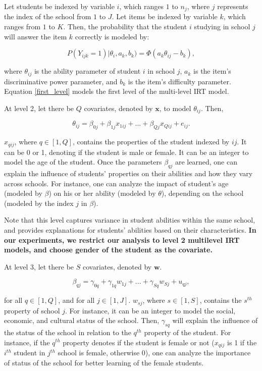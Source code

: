 \documentclass[12pt]{article}
\begin{document}
Let students be indexed by variable $i$, which ranges $1$ to $n_j$, where $j$ represents the index of the school from $1$ to $J$. Let items be indexed by variable $k$, which ranges from $1$ to $K$. Then, the probability that the student $i$ studying in school $j$ will answer the item $k$ correctly is modeled by:

\begin{equation}\label{first_level}
    P(Y_{ijk}=1) | \theta_i, a_k, b_k) = \Phi(a_k \theta_{ij} - b_k),
\end{equation}

where $\theta_{ij}$ is the ability parameter of student $i$ in school $j$, $a_k$ is the item's discriminative power parameter, and $b_k$ is the item's difficulty parameter. Equation \eqref{first_level} models the first level of the multi-level IRT model.

At level 2, let there be $Q$ covariates, denoted by $\boldsymbol{x}$, to model $\theta_{ij}$. Then,

\begin{equation}\label{second_level}
    \theta_{ij} = \beta_{0j} + \beta_{1j}x_{1ij} + ... + \beta_{Qj}x_{Qij} + e_{ij}.
\end{equation}

$x_{qij}$, where $q \in [1, Q]$, contains the properties of the student indexed by $ij$. It can be 0 or 1, denoting if the student is male or female. It can be an integer to model the age of the student. Once the parameters $\beta_{qj}$ are learned, one can explain the influence of students' properties on their abilities and how they vary across schools. For instance, one can analyze the impact of student's age (modeled by $\beta$) on his or her ability (modeled by $\theta$), depending on the school (modeled by the index $j$ in $\beta$).

Note that this level captures variance in student abilities within the same school, and provides explanations for students' abilities based on their characteristics. \textbf{In our experiments, we restrict our analysis to level 2 multilevel IRT models, and choose gender of the student as the covariate.}

At level 3, let there be $S$ covariates, denoted by $\boldsymbol{w}$.

\begin{equation}
    \beta_{qj} = \gamma_{0q} + \gamma_{1q}w_{1j} + ... + \gamma_{Sq}w_{Sj} + u_{qj},
\end{equation}

for all $q \in [1, Q]$, and for all $ j \in [1, J]$. $w_{sj}$, where $s \in [1, S]$, contains the $s^{th}$ property of school $j$. For instance, it can be an integer to model the social, economic, and cultural status of the school. Then, $\gamma_{sq}$ will explain the influence of the status of the school in relation to the $q^{th}$ property of the student. For instance, if the $q^{th}$ property denotes if the student is female or not ($x_{qij}$ is 1 if the $i^{th}$ student in $j^{th}$ school is female, otherwise 0), one can analyze the importance of status of the school for better learning of the female students.
\end{document}
